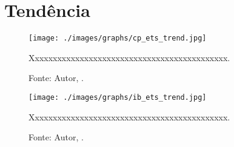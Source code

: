 


\lipsum[100]



\section{Tendência}



\lipsum[100]




\begin{figure}[H]
    \centering
    \texttt{[image: ./images/graphs/cp\_ets\_trend.jpg]}
    \caption{Xxxxxxxxxxxxxxxxxxxxxxxxxxxxxxxxxxxxxxxxxxxx.}
    \label{fig:cp_ets_trend.jpg}
    \caption*{Fonte: Autor, \imprimirdata.}
\end{figure}




\lipsum[100]




\begin{figure}[H]
    \centering
    \texttt{[image: ./images/graphs/ib\_ets\_trend.jpg]}
    \caption{Xxxxxxxxxxxxxxxxxxxxxxxxxxxxxxxxxxxxxxxxxxxx.}
    \label{fig:ib_ets_trend.jpg}
    \caption*{Fonte: Autor, \imprimirdata.}
\end{figure}



